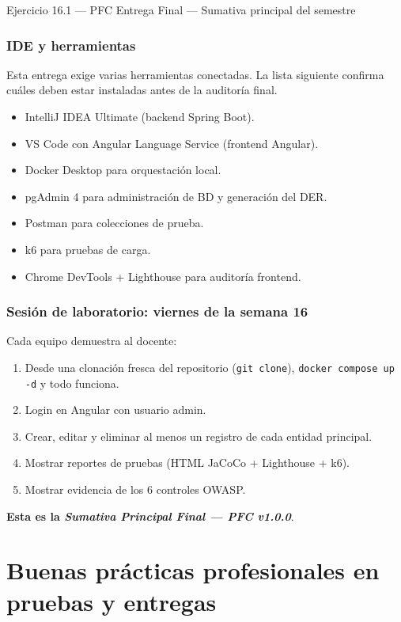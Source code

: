 \documentclass[11pt,a4paper,openany]{book}
\begin{document}
\begin{cajaejercicio}{Ejercicio 16.1 --- PFC Entrega Final --- Sumativa principal del semestre}
\subsubsection*{IDE y herramientas}

Esta entrega exige varias herramientas conectadas. La lista
siguiente confirma cuáles deben estar instaladas antes de la
auditoría final.


\begin{itemize}
\item IntelliJ IDEA Ultimate (backend Spring Boot).
\item VS Code con Angular Language Service (frontend Angular).
\item Docker Desktop para orquestación local.
\item pgAdmin 4 para administración de BD y generación del DER.
\item Postman para colecciones de prueba.
\item k6 para pruebas de carga.
\item Chrome DevTools + Lighthouse para auditoría frontend.
\end{itemize}

\subsubsection*{Sesión de laboratorio: viernes de la semana 16}

Cada equipo demuestra al docente:
\begin{enumerate}
\item Desde una clonación fresca del repositorio
(\texttt{git clone}), \texttt{docker compose up -d} y todo
funciona.
\item Login en Angular con usuario admin.
\item Crear, editar y eliminar al menos un registro de cada entidad
principal.
\item Mostrar reportes de pruebas (HTML JaCoCo + Lighthouse + k6).
\item Mostrar evidencia de los 6 controles OWASP.
\end{enumerate}

\textbf{Esta es la \emph{Sumativa Principal Final --- PFC v1.0.0}}.
\end{cajaejercicio}

\section{Buenas prácticas profesionales en pruebas y entregas}
\end{document}
